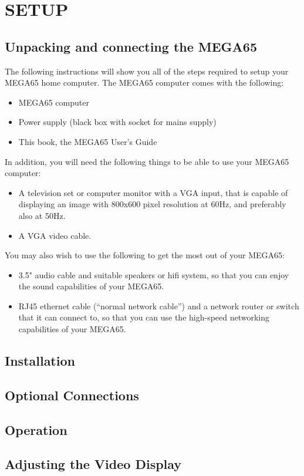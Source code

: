 \chapter{SETUP\ }

\section{Unpacking and connecting the MEGA65}

The following instructions will show you all of the steps required to setup your MEGA65 home computer.
The MEGA65 computer comes with the following:
\begin{itemize}
\item MEGA65 computer
\item Power supply (black box with socket for mains supply)
\item This book, the MEGA65 User's Guide
\end{itemize}

In addition, you will need the following things to be able to use your MEGA65 computer:
\begin{itemize}
\item A television set or computer monitor with a VGA input, that is capable of displaying an image with 800x600 pixel resolution at 60Hz, and preferably also at 50Hz.
\item A VGA video cable.
\end{itemize}

You may also wish to use the following to get the most out of your MEGA65:
\begin{itemize}
\item 3.5" audio cable and suitable speakers or hifi system, so that you can enjoy the sound capabilities of your MEGA65.
\item RJ45 ethernet cable (``normal network cable'') and a network router or switch that it can connect to, so that you can use the high-speed networking capabilities of your MEGA65.
\end{itemize}



\section{Installation}

\section{Optional Connections}

\section{Operation}

\section{Adjusting the Video Display}

